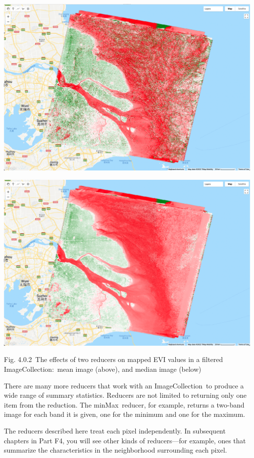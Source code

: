 \documentclass[
  letterpaper,
  DIV=11,
  numbers=noendperiod]{scrreprt}
\begin{document}
\includegraphics{./F4/image43.png}

\includegraphics{./F4/image67.png}

Fig. 4.0.2~The effects of two reducers on mapped EVI values in a
filtered ImageCollection:~mean image (above), and median image (below)

There are many more reducers that work with an ImageCollection~to
produce a wide range of summary statistics. Reducers are not limited to
returning only one item from the reduction. The minMax~reducer, for
example, returns a two-band image for each band it is given, one for the
minimum and one for the maximum.

The reducers described here treat each pixel independently. In
subsequent chapters in Part F4, you will see other kinds of
reducers---for example, ones that summarize the characteristics in the
neighborhood surrounding each pixel.
\end{document}
